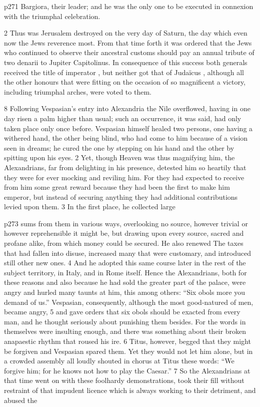 p271 Bargiora, their leader; and he was the only one to be executed in connexion with the triumphal celebration.

2
Thus was Jerusalem destroyed on the very day of Saturn, the day which even now the Jews reverence most. From that time forth it was ordered that the Jews who continued to observe their ancestral customs should pay an annual tribute of two denarii to Jupiter Capitolinus. In consequence of this success both generals received the title of imperator , but neither got that of Judaïcus , although all the other honours that were fitting on the occasion of so magnificent a victory, including triumphal arches, were voted to them.

8
Following Vespasian's entry into Alexandria the Nile overflowed, having in one day risen a palm higher than usual; such an occurrence, it was said, had only taken place only once before. Vespasian himself healed two persons, one having a withered hand, the other being blind, who had come to him because of a vision seen in dreams; he cured the one by stepping on his hand and the other by spitting upon his eyes. 2 Yet, though Heaven was thus magnifying him, the Alexandrians, far from delighting in his presence, detested him so heartily that they were for ever mocking and reviling him. For they had expected to receive from him some great reward because they had been the first to make him emperor, but instead of securing anything they had additional contributions levied upon them. 3 In the first place, he collected large

p273 sums from them in various ways, over­looking no source, however trivial or however reprehensible it might be, but drawing upon every source, sacred and profane alike, from which money could be secured. He also renewed The taxes that had fallen into disuse, increased many that were customary, and introduced still other new ones. 4 And he adopted this same course later in the rest of the subject territory, in Italy, and in Rome itself. Hence the Alexandrians, both for these reasons and also because he had sold the greater part of the palace, were angry and hurled many taunts at him, this among others: ``Six obols more you demand of us.'' Vespasian, consequently, although the most good-natured of men, became angry, 5 and gave orders that six obols should be exacted from every man, and he thought seriously about punishing them besides. For the words in themselves were insulting enough, and there was something about their broken anapaestic rhythm that roused his ire. 6 Titus, however, begged that they might be forgiven and Vespasian spared them. Yet they would not let him alone, but in a crowded assembly all loudly shouted in chorus at Titus these words: ``We forgive him; for he knows not how to play the Caesar.'' 7 So the Alexandrians at that time went on with these foolhardy demonstrations, took their fill without restraint of that impudent licence which is always working to their detriment, and abused the

